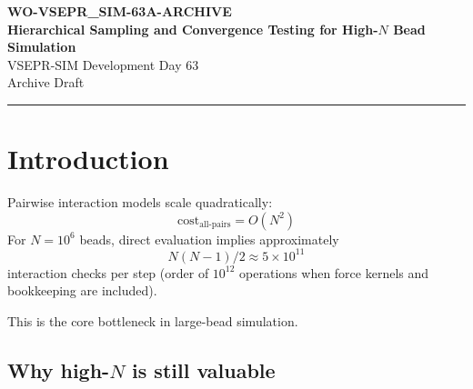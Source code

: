 \documentclass[11pt, a4paper, oneside]{article}
\begin{document}
\begin{center}
  {\LARGE\bfseries WO-VSEPR\_SIM-63A-ARCHIVE}\\[0.4em]
  {\Large\bfseries Hierarchical Sampling and Convergence Testing for High-$N$ Bead Simulation}\\[1.0em]
  {\normalsize VSEPR-SIM Development Day 63}\\[0.3em]
  {\small Archive Draft}
\end{center}

\vspace{0.5em}
\hrule
\vspace{1.2em}

\begin{abstract}
This work order archive defines a practical hierarchy for high-$N$ bead-resolved simulation in VSEPR-SIM. Direct all-pairs interaction evaluation scales as $O(N^2)$ and becomes infeasible for million-bead regimes. The document uses octree decomposition as the computational baseline and introduces a dynamic tree sampling method in which local subdivision depth and measurement density adapt to bead concentration, variance, defect concentration, and convergence instability. The purpose is constrained: not to claim atomistic electronic truth from encoded beads, but to test whether bead-level interaction rules converge toward stable macro-scale measurements under increasing sample count and representative-volume scale. Limitations and validation gates are made explicit to prevent overclaiming.
\end{abstract}

\tableofcontents
\newpage

\section{Introduction}

Pairwise interaction models scale quadratically:
\begin{equation}
\text{cost}_{\text{all-pairs}} = O(N^2)
\end{equation}
For $N=10^6$ beads, direct evaluation implies approximately
\begin{equation}
N(N-1)/2 \approx 5\times 10^{11}
\end{equation}
interaction checks per step (order of $10^{12}$ operations when force kernels and bookkeeping are included).

This is the core bottleneck in large-bead simulation.

\subsection{Why high-\texorpdfstring{$N$}{N} is still valuable}
\end{document}
